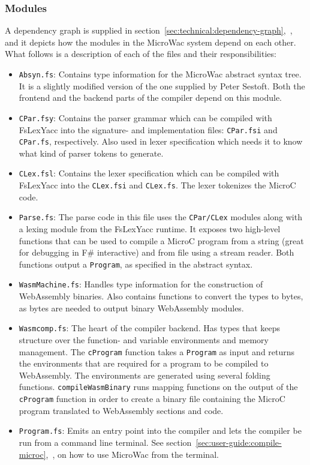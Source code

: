 \documentclass[a4paper]{article}
\begin{document}
\subsubsection{Modules}
A dependency graph is supplied in section~\ref{sec:technical:dependency-graph},~, and it depicts how the modules in the MicroWac system depend on each other. What follows is a description of each of the files and their responsibilities:
\begin{itemize}
	\item \texttt{Absyn.fs}: Contains type information for the MicroWac abstract syntax tree. It is a slightly modified version of the one supplied by Peter Sestoft. Both the frontend and the backend parts of the compiler depend on this module.
	\item \texttt{CPar.fsy}: Contains the parser grammar which can be compiled with FsLexYacc into the signature- and implementation files: \texttt{CPar.fsi} and \texttt{CPar.fs}, respectively. Also used in lexer specification which needs it to know what kind of parser tokens to generate.
	\item \texttt{CLex.fsl}: Contains the lexer specification which can be compiled with FsLexYacc into the \texttt{CLex.fsi} and \texttt{CLex.fs}. The lexer tokenizes the MicroC code.
	\item \texttt{Parse.fs}: The parse code in this file uses the \texttt{CPar/CLex} modules along with a lexing module from the FsLexYacc runtime. It exposes two high-level functions that can be used to compile a MicroC program from a string (great for debugging in F\# interactive) and from file using a stream reader. Both functions output a \texttt{Program}, as specified in the abstract syntax.
	\item \texttt{WasmMachine.fs}: Handles type information for the construction of WebAssembly binaries. Also contains functions to convert the types to bytes, as bytes are needed to output binary WebAssembly modules.
	\item \texttt{Wasmcomp.fs}: The heart of the compiler backend. Has types that keeps structure over the function- and variable environments and memory management. The \texttt{cProgram} function takes a \texttt{Program} as input and returns the environments that are required for a program to be compiled to WebAssembly. The environments are generated using several folding functions. \texttt{compileWasmBinary} runs mapping functions on the output of the \texttt{cProgram} function in order to create a binary file containing the MicroC program translated to WebAssembly sections and code.
	\item \texttt{Program.fs}: Emits an entry point into the compiler and lets the compiler be run from a command line terminal. See section~\ref{sec:user-guide:compile-microc},~, on how to use MicroWac from the terminal.
\end{itemize}
\end{document}

